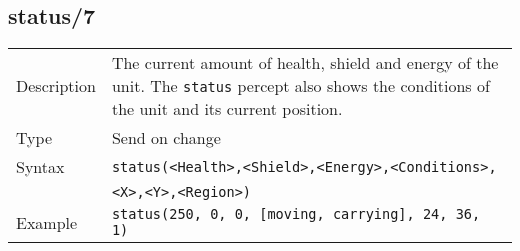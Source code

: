 \subsection{status/7}
\begin{tabularx}{\textwidth}{lX}
 Description & The current amount of health, shield and energy of the unit. The \verb|status| percept also shows the conditions of the unit and its current position. \\
 Type & Send on change \\
 Syntax & \verb|status(<Health>,<Shield>,<Energy>,<Conditions>,| \\
 & \quad \verb|<X>,<Y>,<Region>)| \\
 Example & \verb|status(250, 0, 0, [moving, carrying], 24, 36, 1)|   \\
 \end{tabularx}\\
